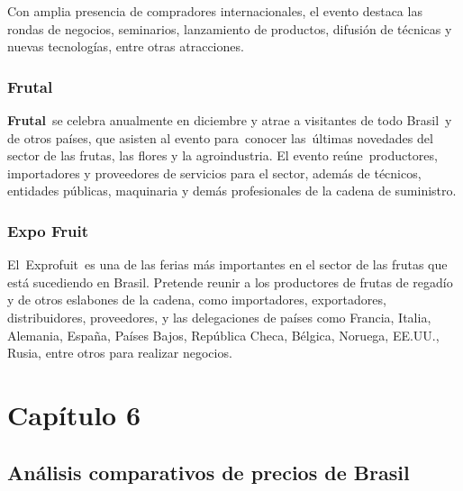 \documentclass[
  stu,
  floatsintext,
  longtable,
  a4paper,
  nolmodern,
  notxfonts,
  notimes,
  colorlinks=true,linkcolor=blue,citecolor=blue,urlcolor=blue]{apa7}
\begin{document}
Con amplia presencia de compradores internacionales, el evento destaca
las rondas de negocios, seminarios, lanzamiento de productos, difusión
de técnicas y nuevas tecnologías, entre otras atracciones.

\subsubsection{Frutal}\label{frutal}

\textbf{Frutal}~se celebra anualmente en diciembre y atrae a visitantes
de todo Brasil~y de otros países, que asisten al evento para~conocer
las~últimas novedades del sector de las frutas, las flores y la
agroindustria. El evento reúne~productores, importadores y proveedores
de servicios para el sector, además de técnicos, entidades públicas,
maquinaria y demás profesionales de la cadena de suministro.

\subsubsection{Expo Fruit}\label{expo-fruit}

El~Exprofuit~es una de las ferias más importantes en el sector de las
frutas que está sucediendo en Brasil. Pretende reunir a los productores
de frutas de regadío y de otros eslabones de la cadena, como
importadores, exportadores, distribuidores, proveedores, y las
delegaciones de países como Francia, Italia, Alemania, España, Países
Bajos, República Checa, Bélgica, Noruega, EE.UU., Rusia, entre otros
para realizar negocios.

\section{Capítulo 6}\label{capuxedtulo-6}

\subsection{Análisis comparativos de precios de
Brasil}\label{anuxe1lisis-comparativos-de-precios-de-brasil}
\end{document}
